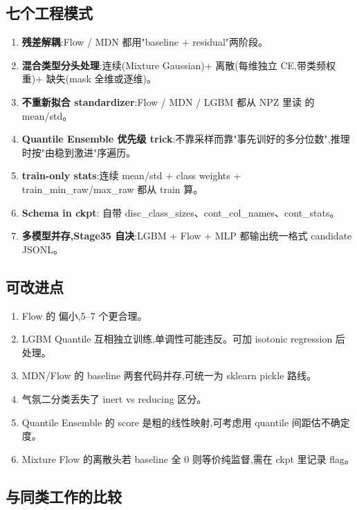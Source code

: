 \subsection{七个工程模式}

\begin{enumerate}
    \item \textbf{残差解耦}:Flow / MDN 都用"baseline + residual"两阶段。
    \item \textbf{混合类型分头处理}:连续(Mixture Gaussian)+ 离散(每维独立 CE,带类频权重)+ 缺失(mask 全维或逐维)。
    \item \textbf{不重新拟合 standardizer}:Flow / MDN / LGBM 都从 NPZ 里读  的 mean/std。
    \item \textbf{Quantile Ensemble 优先级 trick}:不靠采样而靠"事先训好的多分位数",推理时按"由稳到激进"序遍历。
    \item \textbf{train-only stats}:连续 mean/std + class weights + train\_min\_raw/max\_raw 都从 train 算。
    \item \textbf{Schema in ckpt}: 自带 disc\_class\_sizes、cont\_col\_names、cont\_stats。
    \item \textbf{多模型并存,Stage35 自决}:LGBM + Flow + MLP 都输出统一格式 candidate JSONL。
\end{enumerate}

\subsection{可改进点}

\begin{enumerate}[label=(\alph*)]
    \item Flow 的  偏小,5--7 个更合理。
    \item LGBM Quantile 互相独立训练,单调性可能违反。可加 isotonic regression 后处理。
    \item MDN/Flow 的 baseline 两套代码并存,可统一为 sklearn pickle 路线。
    \item 气氛二分类丢失了 inert vs reducing 区分。
    \item Quantile Ensemble 的 score 是粗的线性映射,可考虑用 quantile 间距估不确定度。
    \item Mixture Flow 的离散头若 baseline 全 0 则等价纯监督,需在 ckpt 里记录 flag。
\end{enumerate}

\subsection{与同类工作的比较}


